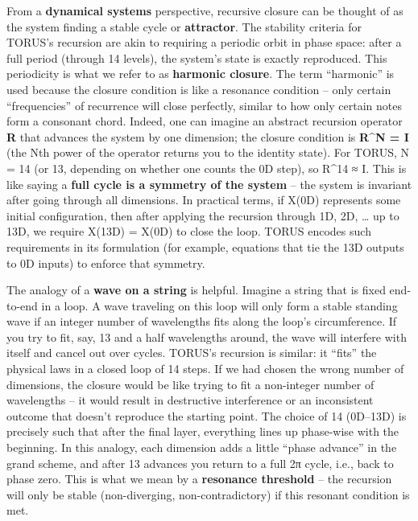 From a \textbf{dynamical systems} perspective, recursive closure can be
thought of as the system finding a stable cycle or \textbf{attractor}.
The stability criteria for TORUS's recursion are akin to requiring a
periodic orbit in phase space: after a full period (through 14 levels),
the system's state is exactly reproduced. This periodicity is what we
refer to as \textbf{harmonic closure}. The term ``harmonic'' is used
because the closure condition is like a resonance condition -- only
certain ``frequencies'' of recurrence will close perfectly, similar to
how only certain notes form a consonant chord. Indeed, one can imagine
an abstract recursion operator \textbf{R} that advances the system by
one dimension; the closure condition is \textbf{R\^{}N = I} (the Nth
power of the operator returns you to the identity state)​. For TORUS, N
= 14 (or 13, depending on whether one counts the 0D step), so R\^{}14 ≈
I. This is like saying a \textbf{full cycle is a symmetry of the system}
-- the system is invariant after going through all dimensions. In
practical terms, if X(0D) represents some initial configuration, then
after applying the recursion through 1D, 2D, \ldots{} up to 13D, we
require X(13D) = X(0D) to close the loop​. TORUS encodes such
requirements in its formulation (for example, equations that tie the 13D
outputs to 0D inputs) to enforce that symmetry.

The analogy of a \textbf{wave on a string} is helpful. Imagine a string
that is fixed end-to-end in a loop. A wave traveling on this loop will
only form a stable standing wave if an integer number of wavelengths
fits along the loop's circumference. If you try to fit, say, 13 and a
half wavelengths around, the wave will interfere with itself and cancel
out over cycles. TORUS's recursion is similar: it ``fits'' the physical
laws in a closed loop of 14 steps. If we had chosen the wrong number of
dimensions, the closure would be like trying to fit a non-integer number
of wavelengths -- it would result in destructive interference or an
inconsistent outcome that doesn't reproduce the starting point​. The
choice of 14 (0D--13D) is precisely such that after the final layer,
everything lines up phase-wise with the beginning. In this analogy, each
dimension adds a little ``phase advance'' in the grand scheme, and after
13 advances you return to a full 2π cycle, i.e., back to phase zero​.
This is what we mean by a \textbf{resonance threshold} -- the recursion
will only be stable (non-diverging, non-contradictory) if this resonant
condition is met.

